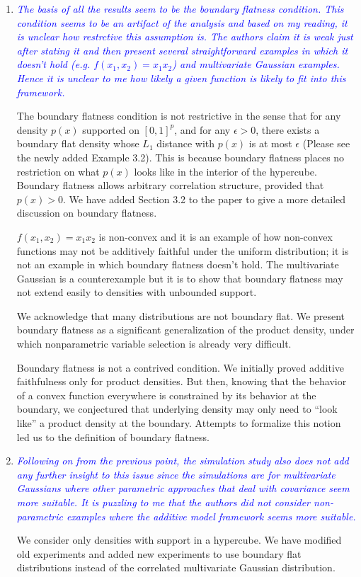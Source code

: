 \documentclass[pdftex,12pt]{article}
\def\rc#1{{\it\textcolor{blue}{#1}}\smallskip}
\begin{document}
\begin{enumerate}
\item \rc{The basis of all the results seem to be the boundary flatness
condition. This condition seems to be an artifact of the analysis and
based on my reading, it is unclear how restrctive this assumption
is. The authors claim it is weak just after stating it and then
present several straightforward examples in which it doesn't hold
(e.g. $f(x_1,x_2)=x_1 x_2$) and multivariate Gaussian examples. Hence it is unclear to me how
likely a given function is likely to fit into this framework.}

The boundary flatness condition is not restrictive in the sense that for any density $p(x)$ supported on $[0,1]^p$, and for any $\epsilon > 0$, there exists a boundary flat density whose $L_1$ distance with $p(x)$ is at most $\epsilon$ (Please see the newly added Example 3.2). This is because boundary flatness places no restriction on what $p(x)$ looks like in the interior of the hypercube. Boundary flatness allows arbitrary correlation structure, provided that $p(x) > 0$. We have added Section 3.2 to the paper to give a more detailed discussion on boundary flatness. 

$f(x_1,x_2) = x_1 x_2$ is non-convex and it is an example of how non-convex functions may not be additively faithful under the uniform distribution; it is not an example in which boundary flatness doesn't hold. The multivariate Gaussian is a counterexample but it is to show that boundary flatness may not extend easily to densities with unbounded support. 

We acknowledge that many distributions are not boundary flat. We present boundary flatness as a significant generalization of the product density, under which nonparametric variable selection is already very difficult.

Boundary flatness is not a contrived condition. We initially proved additive faithfulness only for product densities. But then, knowing that the behavior of a convex function everywhere is constrained by its behavior at the boundary, we conjectured that underlying density may only need to ``look like'' a product density at the boundary. Attempts to formalize this notion led us to the definition of boundary flatness.

\item \rc{Following on from the previous point, the simulation study also does
not add any further insight to this issue since the simulations are
for multivariate Gaussians where other parametric approaches that deal
with covariance seem more suitable. It is puzzling to me that the
authors did not consider non-parametric examples where the additive
model framework seems more suitable.}

We consider only densities with support in a hypercube. We have modified old experiments and added new experiments to use boundary flat distributions instead of the correlated multivariate Gaussian distribution. 


\end{enumerate}
\end{document}
